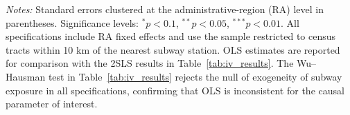 \begin{table}[htbp]
\centering
\caption{Effect of subway exposure on income growth: OLS estimates (10 km sample, 1,000 m threshold)}
\label{tab:ols_results}
\begin{tablenotes}
\scriptsize
\item \textit{Notes:} Standard errors clustered at the administrative-region (RA) level in parentheses. Significance levels: $^{*}p<0.1$, $^{**}p<0.05$, $^{***}p<0.01$. All specifications include RA fixed effects and use the sample restricted to census tracts within 10 km of the nearest subway station. OLS estimates are reported for comparison with the 2SLS results in Table~\ref{tab:iv_results}. The Wu--Hausman test in Table~\ref{tab:iv_results} rejects the null of exogeneity of subway exposure in all specifications, confirming that OLS is inconsistent for the causal parameter of interest.
\end{tablenotes}
\end{table}
